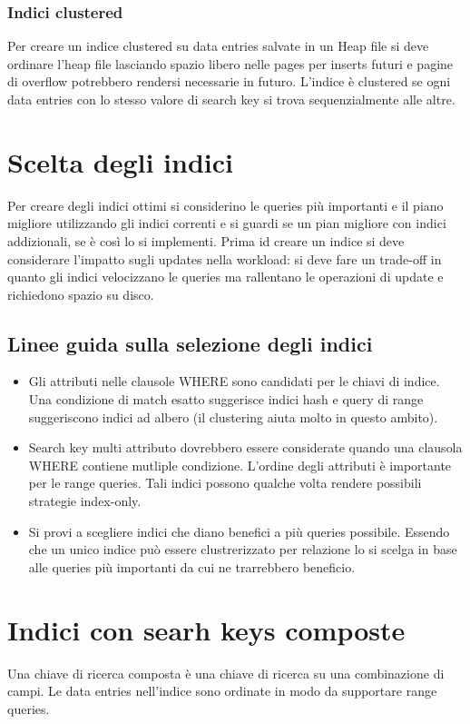 \subsubsection{Indici clustered}
Per creare un indice clustered su data entries salvate in un Heap file si deve ordinare l'heap file lasciando spazio libero nelle pages per inserts futuri e pagine di overflow potrebbero rendersi necessarie in futuro.
L'indice \`e clustered se ogni data entries con lo stesso valore di search key si trova sequenzialmente alle altre. 
\section{Scelta degli indici}
Per creare degli indici ottimi si considerino le queries pi\`u importanti e il piano migliore utilizzando gli indici correnti e si guardi se un pian migliore con indici addizionali, se \`e cos\`i lo si implementi. Prima id
creare un indice si deve considerare l'impatto sugli updates nella workload: si deve fare un trade-off in quanto gli indici velocizzano le queries ma rallentano le operazioni di update e richiedono spazio su disco.
\subsection{Linee guida sulla selezione degli indici}
\begin{itemize}
\item Gli attributi nelle clausole WHERE sono candidati per le chiavi di indice. Una condizione di match esatto suggerisce indici hash e query di range suggeriscono indici ad albero (il clustering aiuta molto in 
questo ambito). 
\item Search key multi attributo dovrebbero essere considerate quando una clausola WHERE contiene mutliple condizione. L'ordine degli attributi \`e importante per le range queries. Tali indici possono 
qualche volta rendere possibili strategie index-only.
\item Si provi a scegliere indici che diano benefici a pi\`u queries possibile. Essendo che un unico indice pu\`o essere clustrerizzato per relazione lo si scelga in base alle queries pi\`u importanti da cui ne 
trarrebbero beneficio.
\end{itemize}
\section{Indici con searh keys composte}
Una chiave di ricerca composta \`e una chiave di ricerca su una combinazione di campi. Le data entries nell'indice sono ordinate in modo da supportare range queries. 